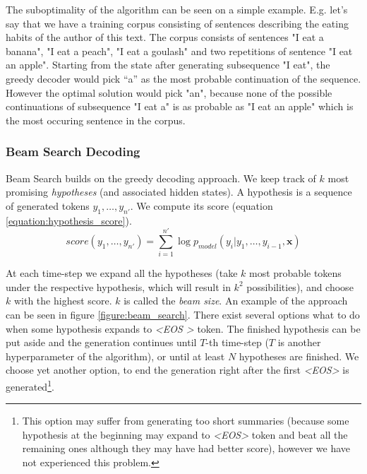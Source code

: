 The suboptimality of the algorithm can be seen on a simple example. E.g. let's say that we have a training corpus consisting of sentences describing the eating habits of the author of this text. The corpus consists of sentences "I eat a banana", "I eat a peach", "I eat a goulash" and two repetitions of sentence "I eat an apple". Starting from the state after generating subsequence "I eat", the greedy decoder would pick ``a'' as the most probable continuation of the sequence. However the optimal solution would pick "an", because none of the possible continuations of subsequence "I eat a" is as probable as "I eat an apple" which is the most occuring sentence in the corpus.

\subsubsection{Beam Search Decoding} \label{subsubsection:beam_search_decoding}

Beam Search builds on the greedy decoding approach. We keep track of $k$ most promising \emph{hypotheses} (and associated hidden states). A hypothesis is a sequence of generated tokens $y_1,\dots,y_{n'}$. We compute its score (equation \ref{equation:hypothesis_score}).
\begin{equation} \label{equation:hypothesis_score}
    score(y_1,\dots,y_{n'}) = \sum_{i=1}^{n'}{\log{p_{model}(y_i | y_1, \dots, y_{i-1}, \boldsymbol{x})}}
\end{equation}

At each time-step we expand all the hypotheses (take $k$ most probable tokens under the respective hypothesis, which will result in $k^2$ possibilities), and choose $k$ with the highest score. $k$ is called the \emph{beam size}. An example of the approach can be seen in figure \ref{figure:beam_search}. There exist several options what to do when some hypothesis expands to \emph{\textless EOS \textgreater} token. The finished hypothesis can be put aside and the generation continues until $T$-th time-step ($T$ is another hyperparameter of the algorithm), or until at least $N$ hypotheses are finished. We choose yet another option, to end the generation right after the first \emph{\textless EOS\textgreater} is generated\footnote{This option may suffer from generating too short summaries (because some hypothesis at the beginning may expand to \emph{\textless EOS\textgreater} token and beat all the remaining ones although they may have had better score), however we have not experienced this problem.}.

